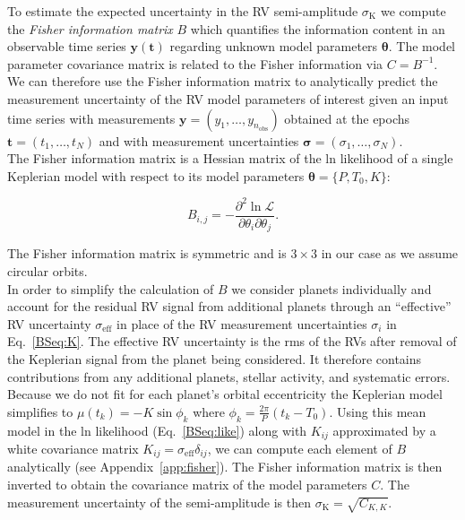 To estimate the expected uncertainty in the RV semi-amplitude $\sigma_{\text{K}}$ we compute the
\emph{Fisher information matrix} $B$ which quantifies the information content in an observable time series
$\mathbf{y}(\mathbf{t})$ regarding unknown model parameters $\boldsymbol{\theta}$. The model parameter
covariance matrix is related to the Fisher information via $C=B^{-1}$. We can therefore
use the Fisher information matrix to analytically predict the measurement uncertainty of the RV model
parameters of interest given an input time series with \nobs{} measurements $\mathbf{y}=(y_1,\dots,y_{n_{\text{obs}}})$
obtained at the epochs $\mathbf{t}=(t_1,\dots,t_N)$ and with measurement uncertainties
$\boldsymbol{\sigma}=(\sigma_1,\dots,\sigma_N)$. \\

The Fisher information matrix is a Hessian matrix of the ln likelihood of a single Keplerian model 
with respect to its model parameters $\boldsymbol{\theta}=\{P,T_0,K\}$:

\begin{equation}
  B_{i,j} = -\frac{\partial^2 \ln{\mathcal{L}}}{\partial \theta_i \partial \theta_j}.
\end{equation}

\noindent The Fisher information matrix is symmetric and is $3 \times 3$ in our case as
we assume circular orbits. \\

In order to simplify the calculation of 
$B$ we consider planets individually and account for the residual RV signal from additional planets
through an ``effective'' RV uncertainty $\sigma_{\text{eff}}$
in place of the RV measurement uncertainties $\sigma_i$
in Eq.~\ref{BSeq:K}. The effective RV uncertainty is the rms of the RVs
after removal of the Keplerian signal from the planet being considered. It therefore contains
contributions from any additional planets, stellar activity, and systematic errors.
Because we do not fit for each planet's orbital eccentricity the
Keplerian model simplifies to $\mu(t_k) = -K \sin{\phi_k}$ where $\phi_k = \frac{2\pi}{P} (t_k-T_0)$.
Using this mean model in the ln likelihood (Eq.~\ref{BSeq:like}) along with $K_{ij}$ approximated by a
white covariance matrix $K_{ij} = \sigma_{\text{eff}} \delta_{ij}$, we can compute each element of $B$ analytically
(see Appendix~\ref{app:fisher}). The Fisher information matrix
is then inverted to obtain the covariance matrix of the model
parameters $C$. The measurement uncertainty of the semi-amplitude is then $\sigma_{\text{K}} = \sqrt{C_{K,K}}$.


